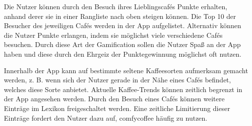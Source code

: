 Die Nutzer können durch den Besuch ihres Lieblingscafés Punkte erhalten, anhand derer sie in einer Rangliste nach oben steigen können. Die Top 10 der Besucher des jeweiligen Cafés werden in der App aufgelistet. Alternativ können die Nutzer Punkte erlangen, indem sie möglichst viele verschiedene Cafés besuchen. Durch diese Art der Gamification sollen die Nutzer Spaß an der App haben und diese durch den Ehrgeiz der Punktegewinnung möglichst oft nutzen.

Innerhalb der App kann auf bestimmte seltene Kaffeesorten aufmerksam gemacht werden, z. B. wenn sich der Nutzer gerade in der Nähe eines Cafés befindet, welches diese Sorte anbietet. Aktuelle Kaffee-Trends können zeitlich begrenzt in der App angesehen werden. Durch den Besuch eines Cafés können weitere Einträge im Lexikon freigeschaltet werden. Eine zeitliche Limitierung dieser Einträge fordert den Nutzer dazu auf, comfycoffee häufig zu nutzen.